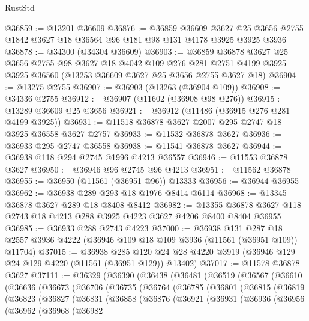 \begin{lexlean}{RustStd}
\begin{coremodule}
@36859 := @13201 @36609
@36876 := @36859
    @36609
    @3627
    @25
    @3656
    @2755
    @1842
    @3627
    @18
    @36564
    @96
    @181
    @98
    @131
    @4178
    @3925
    @3925
    @3936
@36878 := @34300 (@34304 @36609)
@36903 := @36859
    @36878
    @3627
    @25
    @3656
    @2755
    @98
    @3627
    @18
    @4042
    @109
    @276
    @281
    @2751
    @4199
    @3925
    @3925
    @36560
    (@13253 @36609 @3627 @25 @3656 @2755 @3627 @18)
@36904 := @13275 @2755
@36907 := @36903 (@13263 (@36904 @109))
@36908 := @34336 @2755
@36912 := @36907 (@11602 (@36908 @98 @276))
@36915 := @13289 @36609 @25 @3656
@36921 := @36912 (@11486 (@36915 @276 @281 @4199 @3925))
@36931 := @11518 @36878 @3627 @2007 @295 @2747 @18 @3925 @36558 @3627 @2757
@36933 := @11532 @36878 @3627
@36936 := @36933 @295 @2747 @36558
@36938 := @11541 @36878 @3627
@36944 := @36938 @118 @294 @2745 @1996 @4213 @36557
@36946 := @11553 @36878 @3627
@36950 := @36946 @96 @2745 @96 @4213
@36951 := @11562 @36878
@36955 := @36950 (@11561 (@36951 @96)) @13333
@36956 := @36944 @36955
@36962 := @36938 @289 @293 @18 @1976 @8414 @6114
@36968 := @13345 @36878 @3627 @289 @18 @8408 @8412
@36982 := @13355 @36878 @3627 @118 @2743 @18 @4213 @288 @3925 @4223 @3627 @4206 @8400 @8404 @36955
@36985 := @36933 @288 @2743 @4223
@37000 := @36938
    @131
    @287
    @18
    @2557
    @3936
    @4222
    (@36946 @109 @18 @109 @3936 (@11561 (@36951 @109)) @11704)
@37015 := @36938
    @285
    @120
    @24
    @28
    @4220
    @3919
    (@36946 @129 @24 @129 @4220 (@11561 (@36951 @129)) @13402)
@37017 := @11578 @36878 @3627
@37111 := @36329
    (@36390
      (@36438
        (@36481
          (@36519
            (@36567
              (@36610
                (@36636
                  (@36673
                    (@36706
                      (@36735
                        (@36764
                          (@36785
                            (@36801
                              (@36815
                                (@36819
                                  (@36823
                                    (@36827
                                      (@36831
                                        (@36858
                                          (@36876
                                            (@36921
                                              (@36931
                                                (@36936
                                                  (@36956
                                                    (@36962
                                                      (@36968
                                                        (@36982

\end{coremodule}
\end{lexlean}
